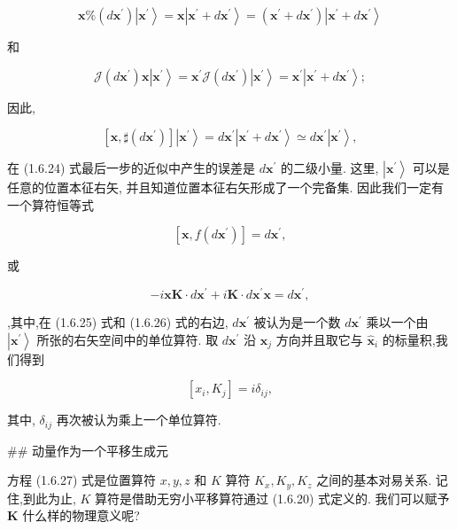 \documentclass[lang=cn,newtx,10pt,scheme=chinese,thmcnt=section]{elegantbook}
\begin{document}
$$
\mathbf{x}\% \left( {d{\mathbf{x}}^{\prime }}\right) \left| {\mathbf{x}}^{\prime }\right\rangle = \mathbf{x}\left| {{\mathbf{x}}^{\prime } + d{\mathbf{x}}^{\prime }}\right\rangle = \left( {{\mathbf{x}}^{\prime } + d{\mathbf{x}}^{\prime }}\right) \left| {{\mathbf{x}}^{\prime } + d{\mathbf{x}}^{\prime }}\right\rangle \tag{1.6.23a}
$$

和

$$
\mathcal{J}\left( {d{\mathbf{x}}^{\prime }}\right) \mathbf{x}\left| {\mathbf{x}}^{\prime }\right\rangle = {\mathbf{x}}^{\prime }\mathcal{J}\left( {d{\mathbf{x}}^{\prime }}\right) \left| {\mathbf{x}}^{\prime }\right\rangle = {\mathbf{x}}^{\prime }\left| {{\mathbf{x}}^{\prime } + d{\mathbf{x}}^{\prime }}\right\rangle ; \tag{1.6.23b}
$$

因此,

$$
\left\lbrack {\mathbf{x},\sharp \left( {d{\mathbf{x}}^{\prime }}\right) }\right\rbrack \left| {\mathbf{x}}^{\prime }\right\rangle = d{\mathbf{x}}^{\prime }\left| {{\mathbf{x}}^{\prime } + d{\mathbf{x}}^{\prime }}\right\rangle \simeq d{\mathbf{x}}^{\prime }\left| {\mathbf{x}}^{\prime }\right\rangle , \tag{1.6.24}
$$

在 (1.6.24) 式最后一步的近似中产生的误差是 $d{\mathbf{x}}^{\prime }$ 的二级小量. 这里, $\left| {\mathbf{x}}^{\prime }\right\rangle$ 可以是任意的位置本征右矢, 并且知道位置本征右矢形成了一个完备集. 因此我们一定有一个算符恒等式

$$
\left\lbrack {\mathbf{x}, f\left( {d{\mathbf{x}}^{\prime }}\right) }\right\rbrack = d{\mathbf{x}}^{\prime }, \tag{1.6.25}
$$

或

$$
- i\mathbf{x}\mathbf{K} \cdot d{\mathbf{x}}^{\prime } + i\mathbf{K} \cdot d{\mathbf{x}}^{\prime }\mathbf{x} = d{\mathbf{x}}^{\prime }, \tag{1.6.26}
$$

,其中,在 (1.6.25) 式和 (1.6.26) 式的右边, $d{\mathbf{x}}^{\prime }$ 被认为是一个数 $d{\mathbf{x}}^{\prime }$ 乘以一个由 $\left| {\mathbf{x}}^{\prime }\right\rangle$ 所张的右矢空间中的单位算符. 取 $d{\mathbf{x}}^{\prime }$ 沿 ${\widehat{\mathbf{x}}}_{j}$ 方向并且取它与 ${\widehat{\mathbf{x}}}_{i}$ 的标量积,我们得到

$$
\left\lbrack {{x}_{i},{K}_{j}}\right\rbrack = i{\delta }_{ij}, \tag{1.6.27}
$$

其中, ${\delta }_{ij}$ 再次被认为乘上一个单位算符.

## 动量作为一个平移生成元

方程 (1.6.27) 式是位置算符 $x, y, z$ 和 $K$ 算符 ${K}_{x},{K}_{y},{K}_{z}$ 之间的基本对易关系. 记住,到此为止, $K$ 算符是借助无穷小平移算符通过 (1.6.20) 式定义的. 我们可以赋予 $\mathbf{K}$ 什么样的物理意义呢?
\end{document}
